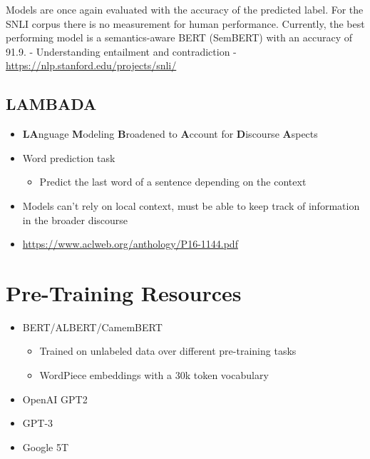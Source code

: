 \documentclass[]{krantz}
\providecommand{\tightlist}{%
  \setlength{\itemsep}{0pt}\setlength{\parskip}{0pt}}
\begin{document}
Models are once again evaluated with the accuracy of the predicted label. For the SNLI corpus there is no measurement for human performance. Currently, the best performing model is a semantics-aware BERT (SemBERT) with an accuracy of 91.9.
- Understanding entailment and contradiction
- \url{https://nlp.stanford.edu/projects/snli/}

\hypertarget{lambada}{%
\subsection{LAMBADA}\label{lambada}}

\begin{itemize}
\tightlist
\item
  \textbf{LA}nguage \textbf{M}odeling \textbf{B}roadened to \textbf{A}ccount for \textbf{D}iscourse \textbf{A}spects
\item
  Word prediction task

  \begin{itemize}
  \tightlist
  \item
    Predict the last word of a sentence depending on the context
  \end{itemize}
\item
  Models can't rely on local context, must be able to keep track of information in the broader discourse
\item
  \url{https://www.aclweb.org/anthology/P16-1144.pdf}
\end{itemize}

\hypertarget{pre-training-resources}{%
\section{Pre-Training Resources}\label{pre-training-resources}}

\begin{itemize}
\tightlist
\item
  BERT/ALBERT/CamemBERT

  \begin{itemize}
  \tightlist
  \item
    Trained on unlabeled data over different pre-training tasks
  \item
    WordPiece embeddings with a 30k token vocabulary
  \end{itemize}
\item
  OpenAI GPT2
\item
  GPT-3
\item
  Google 5T
\end{itemize}
\end{document}
